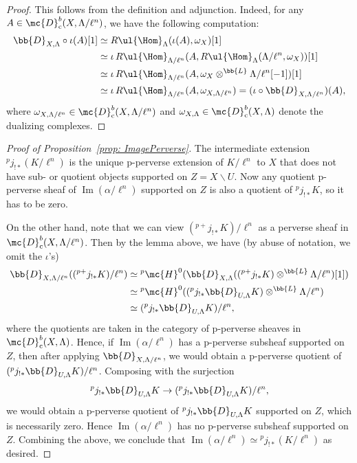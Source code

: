 \begin{proof}
    This follows from the definition and adjunction. Indeed, for any $A\in \mc{D}^b_{\mathrm{c}}(X,\Lambda/\ell^n)$, we have the following computation:
    \begin{align*}
        \bb{D}_{X,\Lambda}\circ \iota( A)[1]&\simeq R\ul{\Hom}_{\Lambda}(\iota(A),\omega_X)[1]\\
        &\simeq \iota\, R\ul{\Hom}_{\Lambda/\ell^n}(A,R\ul{\Hom}_{\Lambda}(\Lambda/\ell^n,\omega_X))[1]\\
        &\simeq \iota\, R\ul{\Hom}_{\Lambda/\ell^n}(A,\omega_X\otimes^\bb{L} \Lambda/\ell^n[-1])[1]\\
        &\simeq \iota\, R\ul{\Hom}_{\Lambda/\ell^n}(A,\omega_{X,\Lambda/\ell^n})=(\iota\circ \bb{D}_{X,\Lambda/\ell^n})(A),
    \end{align*}
    where $\omega_{X,\Lambda/\ell^n}\in \mc{D}^b_\mathrm{c}(X,\Lambda/\ell^n)$ and $\omega_{X,\Lambda}\in \mc{D}^b_\mathrm{c}(X,\Lambda)$ denote the dualizing complexes.
\end{proof}
\begin{proof}[Proof of Proposition~\ref{prop: ImagePerverse}]
    The intermediate extension ${}^{p}j_{!\ast}(K/\ell^n)$ is the unique p-perverse extension of $K/\ell^n$ to $X$ that does not have sub- or quotient objects supported on $Z=X\backslash U$. Now any quotient p-perverse sheaf of $\operatorname{Im}(\alpha/\ell^n)$ supported on $Z$ is also a quotient of ${}^pj_{!\ast}K$, so it has to be zero. 
    
    On the other hand, note that we can view $({}^{p+}j_{!\ast}K)/\ell^n$ as a perverse sheaf in $\mc{D}^b_{\mathrm{c}}(X,\Lambda/\ell^n)$. Then by the lemma above, we have (by abuse of notation, we omit the $\iota$'s)
    \begin{align*}
    \bb{D}_{X,\Lambda/\ell^n}(({}^{p+}j_{!\ast}K)/\ell^n)&\simeq {}^p\mc{H}^0(\bb{D}_{X,\Lambda}(({}^{p+}j_{!\ast}K)\otimes^\bb{L} \Lambda/\ell^n)[1])\\
    &\simeq {}^p\mc{H}^0(({}^{p}j_{!\ast}\bb{D}_{U,\Lambda}K)\otimes^\bb{L}\Lambda/\ell^n)\\
    &\simeq ({}^{p}j_{!\ast}\bb{D}_{U,\Lambda}K)/\ell^n,
    \end{align*}
    where the quotients are taken in the category of p-perverse sheaves in $\mc{D}^b_\mathrm{c}(X,\Lambda)$. Hence, if $\operatorname{Im}(\alpha/\ell^n)$ has a p-perverse subsheaf supported on $Z$, then after applying $\bb{D}_{X,\Lambda/\ell^n}$, we would obtain a p-perverse quotient of $({}^{p}j_{!\ast}\bb{D}_{U,\Lambda}K)/\ell^n$. Composing with the surjection 
    \[{}^{p}j_{!\ast}\bb{D}_{U,\Lambda}K\to ({}^{p}j_{!\ast}\bb{D}_{U,\Lambda}K)/\ell^n,\]
    we would obtain a p-perverse quotient of ${}^{p}j_{!\ast}\bb{D}_{U,\Lambda}K$ supported on $Z$, which is necessarily zero. Hence $\operatorname{Im}(\alpha/\ell^n)$ has no p-perverse subsheaf supported on $Z$.
    Combining the above, we conclude that $\operatorname{Im}(\alpha/\ell^n)\simeq {}^pj_{!\ast}(K/\ell^n)$ as desired.
\end{proof}

